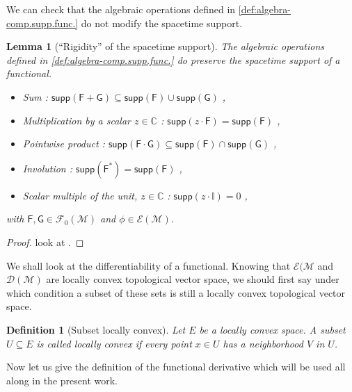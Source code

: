 \documentclass[10pt]{book}
\newcommand{\supp}{\mathsf{supp}}
\newcommand{\Dcal}{\mathcal{D}}
\newcommand{\Ecal}{\mathcal{E}}
\newcommand{\Fcal}{\mathcal{F}}
\newcommand{\Mcal}{\mathcal{M}}
\newcommand{\Cbb}{\mathbb{C}}
\newcommand{\Ibb}{\mathbb{I}}
\newcommand{\Fsf}{\mathsf{F}}
\newcommand{\Gsf}{\mathsf{G}}
\theoremstyle{break}
\newtheorem{lemma}{Lemma}
\newtheorem{definition}{Definition}
\begin{document}
We can check that the algebraic operations defined in \ref{def:algebra-comp.supp.func.} do not modify the spacetime support.


\begin{lemma}[``Rigidity'' of the spacetime support]
The algebraic operations defined in \ref{def:algebra-comp.supp.func.} do preserve the spacetime support of a functional. 
%
\begin{itemize}
\item Sum : $\supp(\Fsf + \Gsf) \subseteq \supp(\Fsf) \cup \supp(\Gsf)$ ,
\item Multiplication by a scalar $z\in\Cbb$ : $\supp(z\cdot\Fsf) = \supp(\Fsf)$ ,
\item Pointwise product : $\supp(\Fsf \cdot \Gsf) \subseteq \supp(\Fsf) \cap \supp(\Gsf)$ ,
\item Involution : $\supp(\Fsf^\ast) = \supp(\Fsf)$ ,
\item Scalar multiple of the unit, $z\in\Cbb$ : $\supp(z\cdot\Ibb) = 0 $ ,
\end{itemize}
%
with $\Fsf, \Gsf \in \Fcal_0(\Mcal)$ and $\phi \in \Ecal(\Mcal)$.
\end{lemma}


\begin{proof}
look at \cite[lemma 2.3.3]{brunetti_algebraic_2012}.
\end{proof}


We shall look at the differentiability of a functional. Knowing that $\Ecal(\Mcal$ and $\Dcal(\Mcal)$ are locally convex topological vector space, we should first say under which condition a subset of these sets is still a locally convex topological vector space.


\begin{definition}[Subset locally convex]
Let $E$ be a locally convex space. A subset $U \subseteq E$ is called locally convex if every point $x \in U$ has a neighborhood $V$ in $U$. 
\end{definition}


Now let us give the definition of the functional derivative which will be used all along in the present work.
\end{document}
